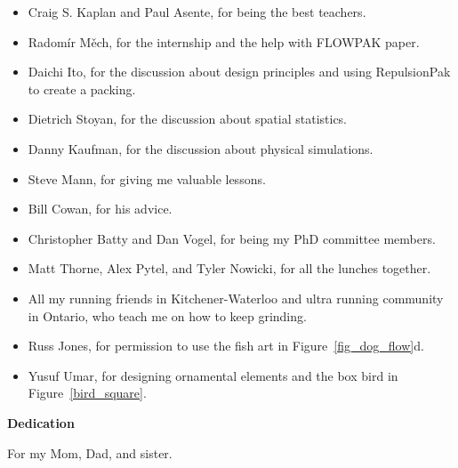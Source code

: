 \begin{itemize}  
\item Craig S. Kaplan and Paul Asente, for being the best teachers.
\item Radom\'ir M\v{e}ch, for the internship and the help with FLOWPAK paper. 
\item Daichi Ito, for the discussion about design principles and using RepulsionPak to create a packing.
\item Dietrich Stoyan, for the discussion about spatial statistics.
\item Danny Kaufman, for the discussion about physical simulations.
\item Steve Mann, for giving me valuable lessons.
\item Bill Cowan, for his advice.
\item Christopher Batty and Dan Vogel, for being my PhD committee members.
\item Matt Thorne, Alex Pytel, and Tyler Nowicki, for all the lunches together. 
\item All my running friends in Kitchener-Waterloo and ultra running community in \mbox{Ontario}, 
who teach me on how to keep grinding.
\item Russ Jones, for permission to use the fish art in Figure~\ref{fig_dog_flow}d.
\item Yusuf Umar, for designing ornamental elements and the box bird in Figure~\ref{bird_square}.
\end{itemize}

\cleardoublepage


\begin{center}\textbf{Dedication}\end{center}

For my Mom, Dad, and sister.
\cleardoublepage

\renewcommand\contentsname{Table of Contents}
\tableofcontents
\cleardoublepage
{}    %

\listoftables
\cleardoublepage
{}		%

\listoffigures
\cleardoublepage
{}		%

\printglossaries
\cleardoublepage
{}		%


